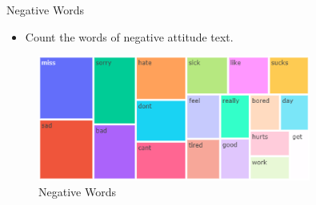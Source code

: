 \documentclass[
 size=14pt,
 paper=smartboard,  %
 mode=present, 		%
 display=slides, 	%
 style=tuliplab,  	%
 pauseslide,
 fleqn,leqno]{powerdot}
\begin{document}
\begin{slide}{Negative Words}
  \begin{itemize}
    \item Count the words of negative attitude text.
  \end{itemize}
  \begin{figure}[htbp]
    \centering
    \includegraphics[width=0.8\textwidth]{figures//negative_test.eps}
    \caption{Negative Words}
  \end{figure}
\end{slide}
\end{document}

